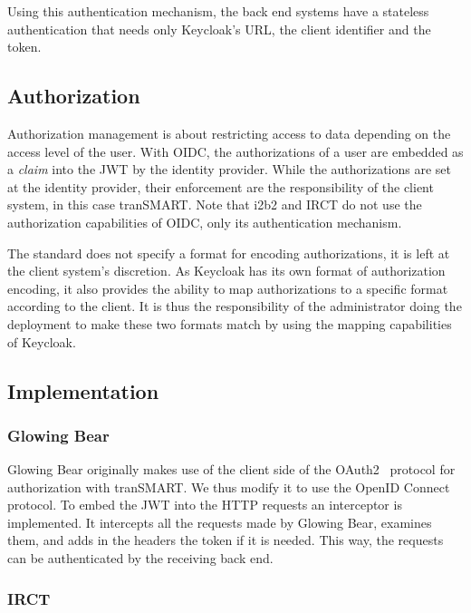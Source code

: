 Using this authentication mechanism, the back end systems have a stateless authentication that needs only Keycloak's URL, the client identifier and the token.

\subsection{Authorization}

Authorization management is about restricting access to data depending on the access level of the user.
With OIDC, the authorizations of a user are embedded as a \emph{claim} into the JWT by the identity provider.
While the authorizations are set at the identity provider, their enforcement are the responsibility of the client system, in this case tranSMART. 
Note that i2b2 and IRCT do not use the authorization capabilities of OIDC, only its authentication mechanism.

The standard does not specify a format for encoding authorizations, it is left at the client system's discretion.
As Keycloak has its own format of authorization encoding, it also provides the ability to map authorizations to a specific format according to the client.
It is thus the responsibility of the administrator doing the deployment to make these two formats match by using the mapping capabilities of Keycloak.


\subsection{Implementation}

\subsubsection{Glowing Bear}

Glowing Bear originally makes use of the client side of the OAuth2~\cite{rfc:oauth2} protocol for authorization with tranSMART. 
We thus modify it to use the OpenID Connect protocol.
To embed the JWT into the HTTP requests an interceptor is implemented. 
It intercepts all the requests made by Glowing Bear, examines them, and adds in the headers the token if it is needed.
This way, the requests can be authenticated by the receiving back end.

\subsubsection{IRCT}

